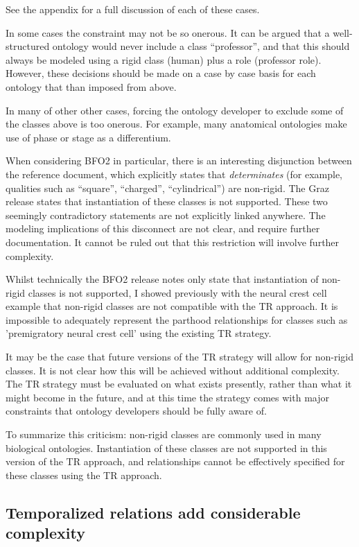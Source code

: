 \documentclass{bioinfo}
\begin{document}
See the appendix for a full discussion of each of these cases.

In some cases the constraint may not be so onerous. It can be argued
that a well-structured ontology would never include a class
``professor'', and that this should always be modeled using a rigid
class (human) plus a role (professor role). However, these decisions
should be made on a case by case basis for each ontology that than
imposed from above.

In many of other other cases, forcing the ontology developer to
exclude some of the classes above is too onerous. For example, many
anatomical ontologies make use of phase or stage as a differentium.

When considering BFO2 in particular, there is an interesting
disjunction between the reference document, which explicitly states
that \emph{determinates} (for example, qualities such as ``square'',
``charged'', ``cylindrical'') are non-rigid. The Graz release states
that instantiation of these classes is not supported. These two
seemingly contradictory statements are not explicitly linked
anywhere. The modeling implications of this disconnect are not clear,
and require further documentation. It cannot be ruled out that this
restriction will involve further complexity.

Whilst technically the BFO2 release notes only state that
instantiation of non-rigid classes is not supported, I showed
previously with the neural crest cell example that non-rigid classes
are not compatible with the TR approach. It is impossible to
adequately represent the parthood relationships for classes such as
'premigratory neural crest cell' using the existing TR strategy.

It may be the case that future versions of the TR strategy will allow
for non-rigid classes. It is not clear how this will be achieved
without additional complexity.  The TR strategy must be evaluated on
what exists presently, rather than what it might become in the future,
and at this time the strategy comes with major constraints that
ontology developers should be fully aware of.

To summarize this criticism: non-rigid classes are commonly used in
many biological ontologies. Instantiation of these classes are not
supported in this version of the TR approach, and relationships cannot
be effectively specified for these classes using the TR approach.

\subsection{Temporalized relations add considerable complexity}
\end{document}
